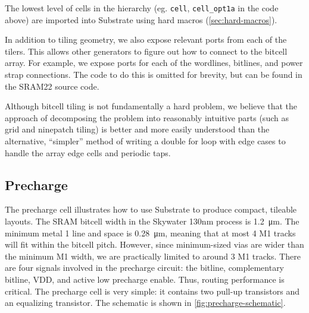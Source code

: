 The lowest level of cells in the hierarchy (eg. \verb|cell|, \verb|cell_opt1a| in the code above) are imported
into Substrate using hard macros (\ref{sec:hard-macros}).

In addition to tiling geometry, we also expose relevant ports from each of the tilers. This allows
other generators to figure out how to connect to the bitcell array. For example, we expose ports for
each of the wordlines, bitlines, and power strap connections. The code to do this is omitted for brevity,
but can be found in the SRAM22 source code.

Although bitcell tiling is not fundamentally a hard problem, we believe that the approach of decomposing
the problem into reasonably intuitive parts (such as grid and ninepatch tiling) is better and more easily understood
than the alternative, ``simpler'' method of writing a double for loop
with edge cases to handle the array edge cells and periodic taps.

\subsection{Precharge} \label{sec:precharge-layout}

The precharge cell illustrates how to use Substrate to produce compact, tileable layouts.
The SRAM bitcell width in the Skywater 130nm process is \SI{1.2}{\micro\meter}.
The minimum metal 1 line and space is \SI{0.28}{\micro\meter},
meaning that at most 4 M1 tracks will fit within the bitcell pitch. However, since minimum-sized vias are wider
than the minimum M1 width, we are practically limited to around 3 M1 tracks. There are four signals involved
in the precharge circuit: the bitline, complementary bitline, VDD, and active low precharge enable.
Thus, routing performance is critical.
The precharge cell is very simple: it contains two pull-up transistors and an equalizing transistor.
The schematic is shown in \ref{fig:precharge-schematic}.



